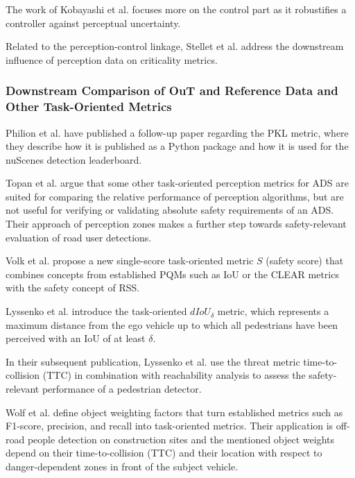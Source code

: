 \documentclass[conference]{IEEEtran}
\newcommand{\new}[1]{{\color{my-red}#1}}
\begin{document}
The work of Kobayashi et al. \cite{Kobayashi2021} focuses more on the control part as it robustifies a controller against perceptual uncertainty.


Related to the perception-control linkage, Stellet et al. \cite{Stellet2015propagation} address the downstream influence of perception data on criticality metrics.



\subsubsection{Downstream Comparison of \new{OuT} and Reference Data \new{and Other Task-Oriented Metrics}}
\label{sec:downstream_comparison}

Philion et al. \cite{Philion2020implementingPKL} have published a follow-up paper regarding the PKL metric, where they describe how it is published as a Python package and how it is used for the nuScenes detection leaderboard.

Topan et al. \cite{Topan2022zones} argue that some other task-oriented perception metrics for ADS are suited for comparing the relative performance of perception algorithms, but are not useful for verifying or validating absolute safety requirements of an ADS. Their approach of perception zones makes a further step towards safety-relevant evaluation of road user detections.

Volk et al. \cite{Volk2020metric} propose a new single-score task-oriented metric $S$ (safety score) that combines concepts from established PQMs such as IoU or the CLEAR metrics with the safety concept of RSS. 

Lyssenko et al. \cite{Lyssenko2021relevance} introduce the task-oriented $dIoU_\delta$ metric, which represents a maximum distance from the ego vehicle up to which all pedestrians have been perceived with an IoU of at least $\delta$. 

In their subsequent publication, Lyssenko et al. \cite{Lyssenko2022safety} use the threat metric time-to-collision (TTC) in combination with reachability analysis to assess the safety-relevant performance of a pedestrian detector. 

Wolf et al. \cite{Wolf2021people} define object weighting factors that turn established metrics such as F1-score, precision, and recall into task-oriented metrics. 
Their application is off-road people detection on construction sites and the mentioned object weights depend on their time-to-collision (TTC) and their location with respect to danger-dependent zones in front of the subject vehicle. 
\end{document}

